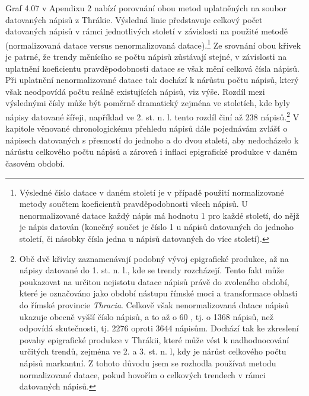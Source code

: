 Graf 4.07 v Apendixu 2 nabízí porovnání obou metod uplatněných na soubor datovaných nápisů z Thrákie. Výsledná linie představuje celkový počet datovaných nápisů v rámci jednotlivých století v závislosti na použité metodě (normalizovaná datace versus nenormalizovaná datace).\footnote{Výsledné číslo datace v daném století je v případě použití normalizované metody součtem koeficientů pravděpodobnosti všech nápisů. U nenormalizované datace každý nápis má hodnotu 1 pro každé století, do nějž je nápis datován (konečný součet je číslo 1 u nápisů datovaných do jednoho století, či násobky čísla jedna u nápisů datovaných do více století).} Ze srovnání obou křivek je patrné, že trendy měnícího se počtu nápisů zůstávají stejné, v závislosti na uplatnění koeficientu pravděpodobnosti datace se však mění celková čísla nápisů. Při uplatnění nenormalizované datace tak dochází k nárůstu počtu nápisů, který však neodpovídá počtu reálně existujících nápisů, viz výše. Rozdíl mezi výslednými čísly může být poměrně dramatický zejména ve stoletích, kde byly nápisy datované šířeji, například ve 2. st. n. l. tento rozdíl činí až 238 nápisů.\footnote{Obě dvě křivky zaznamenávají podobný vývoj epigrafické produkce, až na nápisy datované do 1. st. n. l., kde se trendy rozcházejí. Tento fakt může poukazovat na určitou nejistotu datace nápisů právě do zvoleného období, které je označováno jako období nástupu římské moci a transformace oblasti do římské provincie {\em Thracia}. Celkově však nenormalizovaná datace nápisů ukazuje obecně vyšší číslo nápisů, a to až o 60 , tj. o 1368 nápisů, než odpovídá skutečnosti, tj. 2276 oproti 3644 nápisům. Dochází tak ke zkreslení povahy epigrafické produkce v Thrákii, které může vést k nadhodnocování určitých trendů, zejména ve 2. a 3. st. n. l, kdy je nárůst celkového počtu nápisů markantní. Z tohoto důvodu jsem se rozhodla používat metodu normalizované datace, pokud hovořím o celkových trendech v rámci datovaných nápisů.} V kapitole věnované chronologickému přehledu nápisů dále pojednávám zvlášť o nápisech datovaných s přesností do jednoho a do dvou staletí, aby nedocházelo k nárůstu celkového počtu nápisů a zároveň i inflaci epigrafické produkce v daném časovém období.


